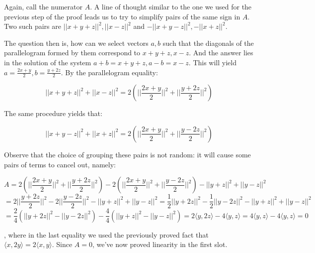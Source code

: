 \begin{solution}
\begin{itemize}
    Again, call the numerator $A$. A line of thought similar to the one we used for the previous step of the proof leads us to try to simplify pairs of the same sign in $A$. Two such pairs are $\lvert \lvert x + y + z  \rvert \rvert^2, \lvert \lvert x - z \rvert \rvert^2$ and $-\lvert \lvert x + y - z \rvert \rvert^2, -\lvert \lvert x + z \rvert \rvert^2$. 
    
    The question then is, how can we select vectors $a, b$ such that the diagonals of the parallelogram formed by them correspond to $x + y + z, x - z$. And the answer lies in the solution of the system $a + b = x + y + z, a - b = x -z$. This will yield $a = \frac{2x + y}{2}, b = \frac{y + 2z}{2}$. By the parallelogram equality:

    $$\lvert \lvert x + y + z \rvert \rvert^2 + \lvert \lvert x - z \rvert \rvert^2 = 2(\lvert \lvert \frac{2x + y}{2} \rvert \rvert^2 + \lvert \lvert \frac{y + 2z}{2} \rvert \rvert^2)$$

    The same procedure yields that:

    $$\lvert \lvert x + y - z \rvert \rvert^2 + \lvert \lvert x + z \rvert \rvert^2 = 2(\lvert \lvert \frac{2x + y}{2} \rvert \rvert^2 + \lvert \lvert \frac{y - 2z}{2} \rvert \rvert^2)$$

    Observe that the choice of grouping these pairs is not random: it will cause some pairs of terms to cancel out, namely:

    $$A = 2(\lvert \lvert \frac{2x + y}{2} \rvert \rvert^2 + \lvert \lvert \frac{y + 2z}{2} \rvert \rvert^2) - 2(\lvert \lvert \frac{2x + y}{2} \rvert \rvert^2 + \lvert \lvert \frac{y - 2z}{2} \rvert \rvert^2) - \lvert \lvert y + z \rvert \rvert^2 + \lvert \lvert y - z \rvert \rvert^2$$
    $$ = 2\lvert \lvert \frac{y + 2z}{2} \rvert \rvert^2 - 2 \lvert \lvert \frac{y - 2z}{2} \rvert \rvert^2 - \lvert \lvert y + z \rvert \rvert^2 + \lvert \lvert y - z \rvert \rvert^2 = \frac{1}{2}\lvert \lvert y + 2z \rvert \rvert^2 - \frac{1}{2} \lvert \lvert y - 2z \rvert \rvert^2 - \lvert \lvert y + z \rvert \rvert^2 + \lvert \lvert y - z \rvert \rvert^2 $$
    $$ = \frac{2}{4}(\lvert \lvert y + 2z \rvert \rvert^2 - \lvert \lvert y - 2z \rvert \rvert^2) - \frac{4}{4}(\lvert \lvert y + z \rvert \rvert^2 - \lvert \lvert y - z \rvert \rvert^2) = 2\langle y, 2z \rangle - 4 \langle y, z \rangle = 4 \langle y, z \rangle - 4 \langle y, z \rangle = 0$$

    , where in the last equality we used the previously proved fact that $\langle x, 2y \rangle = 2 \langle x, y \rangle$. Since $A = 0$, we've now proved linearity in the first slot.


\end{itemize}
\end{solution}
